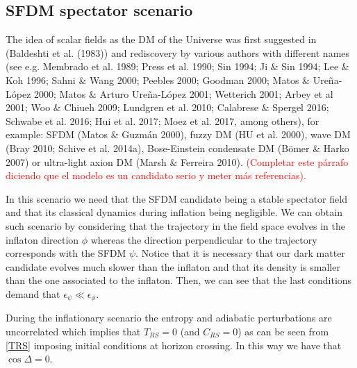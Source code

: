\documentclass[twocolumn,           %
               showpacs,            %
               preprintnumbers,     %
               aps,                 %
               prl,          	    %
               letterpaper,             %
               superscriptaddress,      %
               nofootinbib,         %
               tightenlines,        %
               floats,floatfix      %
               ,usenatbib,
               ]{revtex4-1}
\begin{document}
\subsection{SFDM spectator scenario}
The idea of scalar fields as the DM of the Universe was first suggested in (Baldeshti et al. (1983)) and rediscovery by various authors with different names (see e.g. Membrado et al. 1989; Press et al. 1990; Sin 1994; Ji $\&$ Sin 1994; Lee $\&$ Koh 1996; Sahni $\&$ Wang 2000; Peebles 2000; Goodman 2000; Matos $\&$ Ure\~na-L\'opez 2000; Matos $\&$ Arturo Ure\~na-L\'opez 2001; Wetterich 2001; Arbey et al 2001; Woo $\&$ Chiueh 2009; Lundgren et al. 2010; Calabrese $\&$ Spergel 2016; Schwabe et al. 2016; Hui et al. 2017; Moez et al. 2017, among others), for example: SFDM (Matos $\&$ Guzm\'an 2000), fuzzy DM (HU et al. 2000), wave DM (Bray 2010; Schive et al. 2014a), Bose-Einstein condensate DM (B\"omer $\&$ Harko 2007) or ultra-light axion DM (Marsh $\&$ Ferreira 2010). \textcolor{red}{(Completar este p\'arrafo diciendo que el modelo es un candidato serio y meter m\'as referencias).} 


In this scenario we need that the SFDM candidate being a stable spectator field and that its classical dynamics during inflation being negligible. We can obtain such scenario by considering that the trajectory in the field space evolves in the inflaton direction $\phi$ whereas the direction perpendicular to the trajectory corresponds with the SFDM $\psi$. Notice that it is necessary that our dark matter candidate evolves much slower than the inflaton and that its density is smaller than the one associated to the inflaton. Then, we can see that the last conditions demand that $\epsilon_\psi\ll \epsilon_\phi$.

During the inflationary scenario the entropy and adiabatic perturbations are uncorrelated which implies that $T_{RS}=0$ (and $C_{RS}=0$) as can be seen from \eqref{TRS} imposing initial conditions at horizon crossing. In this way we have that $\cos\Delta =0$. 
\end{document}
